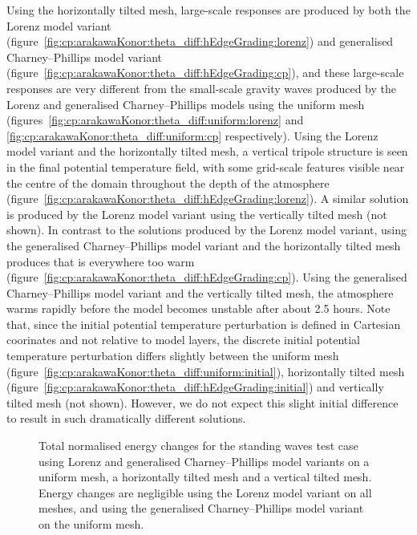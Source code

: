 Using the horizontally tilted mesh, large-scale responses are produced by both the Lorenz model variant (figure~\ref{fig:cp:arakawaKonor:theta_diff:hEdgeGrading:lorenz}) and generalised Charney--Phillips model variant (figure~\ref{fig:cp:arakawaKonor:theta_diff:hEdgeGrading:cp}), and these large-scale responses are very different from the small-scale gravity waves produced by the Lorenz and generalised Charney--Phillips models using the uniform mesh (figures~\ref{fig:cp:arakawaKonor:theta_diff:uniform:lorenz} and \ref{fig:cp:arakawaKonor:theta_diff:uniform:cp} respectively).
Using the Lorenz model variant and the horizontally tilted mesh, a vertical tripole structure is seen in the final potential temperature field, with some grid-scale features visible near the centre of the domain throughout the depth of the atmosphere (figure~\ref{fig:cp:arakawaKonor:theta_diff:hEdgeGrading:lorenz}).
A similar solution is produced by the Lorenz model variant using the vertically tilted mesh (not shown).
In contrast to the solutions produced by the Lorenz model variant, using the generalised Charney--Phillips model variant and the horizontally tilted mesh produces that is everywhere too warm (figure~\ref{fig:cp:arakawaKonor:theta_diff:hEdgeGrading:cp}).
Using the generalised Charney--Phillips model variant and the vertically tilted mesh, the atmosphere warms rapidly before the model becomes unstable after about \num{2.5} hours.
Note that, since the initial potential temperature perturbation is defined in Cartesian coorinates and not relative to model layers, the discrete initial potential temperature perturbation differs slightly between the uniform mesh (figure~\ref{fig:cp:arakawaKonor:theta_diff:uniform:initial}), horizontally tilted mesh (figure~\ref{fig:cp:arakawaKonor:theta_diff:hEdgeGrading:initial}) and vertically tilted mesh (not shown).
However, we do not expect this slight initial difference to result in such dramatically different solutions.

\begin{figure}
	\centering
	
	\caption{Total normalised energy changes for the standing waves test case using Lorenz and generalised Charney--Phillips model variants on a uniform mesh, a horizontally tilted mesh and a vertical tilted mesh.
	Energy changes are negligible using the Lorenz model variant on all meshes, and using the generalised Charney--Phillips model variant on the uniform mesh.}
	\label{fig:cp:arakawaKonor:conservation}
\end{figure}

